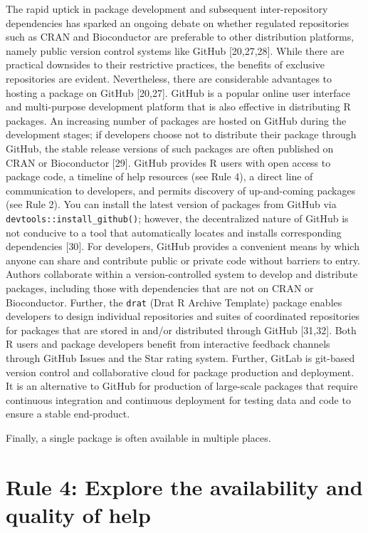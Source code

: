 \documentclass[10pt,letterpaper]{article}
\begin{document}
The rapid uptick in package development and subsequent inter-repository
dependencies has sparked an ongoing debate on whether regulated
repositories such as CRAN and Bioconductor are preferable to other
distribution platforms, namely public version control systems like
GitHub {[}20,27,28{]}. While there are practical downsides to their
restrictive practices, the benefits of exclusive repositories are
evident. Nevertheless, there are considerable advantages to hosting a
package on GitHub {[}20,27{]}. GitHub is a popular online user interface
and multi-purpose development platform that is also effective in
distributing R packages. An increasing number of packages are hosted on
GitHub during the development stages; if developers choose not to
distribute their package through GitHub, the stable release versions of
such packages are often published on CRAN or Bioconductor {[}29{]}.
GitHub provides R users with open access to package code, a timeline of
help resources (see Rule 4), a direct line of communication to
developers, and permits discovery of up-and-coming packages (see Rule
2). You can install the latest version of packages from GitHub via
\texttt{devtools::install\_github()}; however, the decentralized nature
of GitHub is not conducive to a tool that automatically locates and
installs corresponding dependencies {[}30{]}. For developers, GitHub
provides a convenient means by which anyone can share and contribute
public or private code without barriers to entry. Authors collaborate
within a version-controlled system to develop and distribute packages,
including those with dependencies that are not on CRAN or Bioconductor.
Further, the \texttt{drat} (Drat R Archive Template) package enables
developers to design individual repositories and suites of coordinated
repositories for packages that are stored in and/or distributed through
GitHub {[}31,32{]}. Both R users and package developers benefit from
interactive feedback channels through GitHub Issues and the Star rating
system. Further, GitLab is git-based version control and collaborative
cloud for package production and deployment. It is an alternative to
GitHub for production of large-scale packages that require continuous
integration and continuous deployment for testing data and code to
ensure a stable end-product.

Finally, a single package is often available in multiple places.

\hypertarget{rule-4-explore-the-availability-and-quality-of-help}{%
\section{Rule 4: Explore the availability and quality of
help}\label{rule-4-explore-the-availability-and-quality-of-help}}
\end{document}
